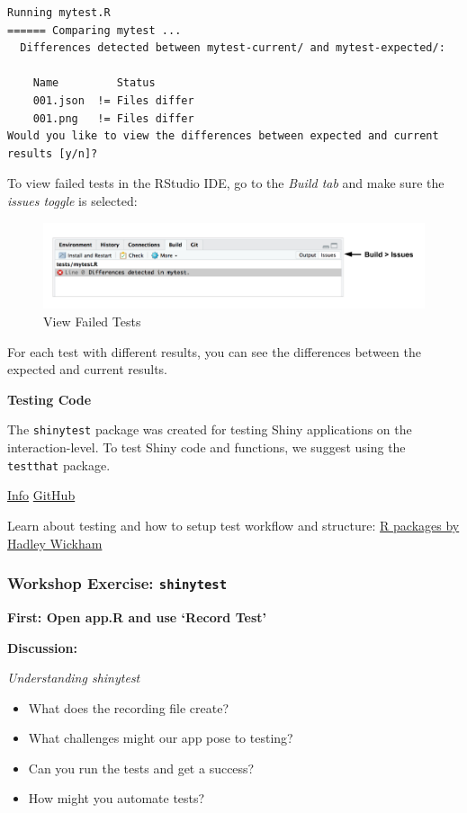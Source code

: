 \documentclass[]{book}
\providecommand{\tightlist}{%
  \setlength{\itemsep}{0pt}\setlength{\parskip}{0pt}}
\theoremstyle{definition}
\theoremstyle{definition}
\theoremstyle{definition}
\theoremstyle{remark}
\begin{document}
\begin{verbatim}
Running mytest.R 
====== Comparing mytest ...
  Differences detected between mytest-current/ and mytest-expected/:

    Name         Status      
    001.json  != Files differ
    001.png   != Files differ
Would you like to view the differences between expected and current results [y/n]? 
\end{verbatim}

To view failed tests in the RStudio IDE, go to the \emph{Build tab} and
make sure the \emph{issues toggle} is selected:

\begin{figure}
\centering
\includegraphics{imgs/testing/failed_tests.png}
\caption{View Failed Tests}
\end{figure}

For each test with different results, you can see the differences
between the expected and current results.

\textbf{Testing Code}

The \texttt{shinytest} package was created for testing Shiny
applications on the interaction-level. To test Shiny code and functions,
we suggest using the \texttt{testthat} package.

\href{http://testthat.r-lib.org/}{Info}
\href{https://github.com/r-lib/testthat}{GitHub}

Learn about testing and how to setup test workflow and structure:
\href{http://r-pkgs.had.co.nz/tests.html}{R packages by Hadley Wickham}

\hypertarget{workshop-exercise-shinytest}{%
\subsubsection{\texorpdfstring{Workshop Exercise:
\texttt{shinytest}}{Workshop Exercise: shinytest}}\label{workshop-exercise-shinytest}}

\textbf{First: Open app.R and use `Record Test'}

\textbf{Discussion:}

\emph{Understanding shinytest}

\begin{itemize}
\tightlist
\item
  What does the recording file create?
\item
  What challenges might our app pose to testing?
\item
  Can you run the tests and get a success?
\item
  How might you automate tests?
\end{itemize}
\end{document}
